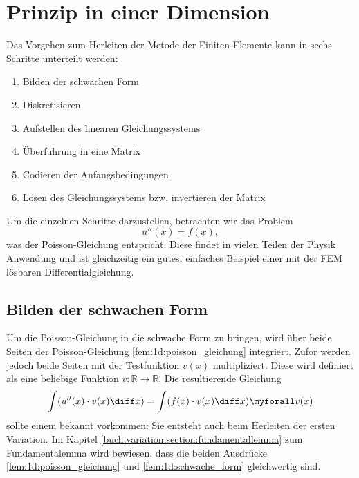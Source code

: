 %
%
%
%
\section{Prinzip in einer Dimension\label{fem:prinzip_1d}}

Das Vorgehen zum Herleiten der Metode der Finiten Elemente kann in sechs Schritte unterteilt werden:
\begin{enumerate}
    \item Bilden der schwachen Form
    \item Diskretisieren
    \item Aufstellen des linearen Gleichungssystems
    \item Überführung in eine Matrix
    \item Codieren der Anfangsbedingungen
    \item Lösen des Gleichungssystems bzw. invertieren der Matrix
\end{enumerate}

Um die einzelnen Schritte darzustellen, betrachten wir das Problem
\begin{equation}
    u''(x) = f(x)
    \label{fem:1d:poisson_gleichung},
\end{equation}
was der Poisson-Gleichung entspricht. 
Diese findet in vielen Teilen der Physik Anwendung und ist gleichzeitig ein gutes, einfaches Beispiel einer mit der FEM lösbaren Differentialgleichung.


\subsection{Bilden der schwachen Form}
Um die Poisson-Gleichung in die schwache Form zu bringen, wird über beide Seiten der Poisson-Gleichung \ref{fem:1d:poisson_gleichung} integriert.
Zufor werden jedoch beide Seiten mit der Testfunktion $ v(x) $ multipliziert. %
Diese wird definiert als eine beliebige Funktion $ v \colon \mathbb{R} \rightarrow \mathbb{R} $.
Die resultierende Gleichung
\begin{equation}
    \int(u''(x) \cdot v(x) \diff x) = \int(f(x) \cdot v(x) \diff x) \myforall v(x)
    \label{fem:1d:schwache_form}
\end{equation}
sollte einem bekannt vorkommen: Sie entsteht auch beim Herleiten der ersten Variation.
Im Kapitel \ref{buch:variation:section:fundamentallemma} zum Fundamentalemma wird bewiesen, dass die beiden Ausdrücke \ref{fem:1d:poisson_gleichung} und \ref{fem:1d:schwache_form} gleichwertig sind.

